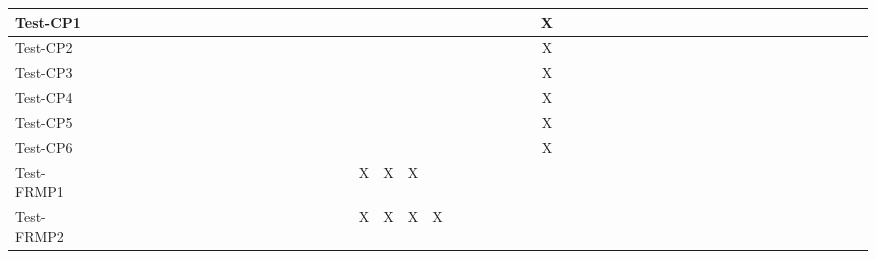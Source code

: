 \documentclass[12pt, titlepage]{article}
\begin{document}
\begin{landscape}
\begin{table}[H]
\begin{adjustwidth}{-0.1in}{-1in}
{\begin{tabular}{c|c|c|c|c|c|c|c|c|c|c|c|c|c|c|c|c|c|c|c|c|c|c|c|c|c|c|c|c|c|c|c|c|c|c|c|c|c|c|c|c|c|c|c|c|c|c|c|c|c|c|c|}
\multicolumn{1}{|l|}{{Test-CP1}}  &             &              &             &             &             &             &             &             &              &              &             &             &              &             &              &            &&&&&&&&&&&&&X&&&&&&&&&&&&&&&&&&&&&&  \\ \hline
\multicolumn{1}{|l|}{{Test-CP2}}  &             &              &             &              &             &             &             &             &              &              &             &             &              &             &              &            &&&&&&&&&&&&&X&&&&&&&&&&&&&&&&&&&&&& \\ \hline
\multicolumn{1}{|l|}{{Test-CP3}}  &             &              &             &              &             &             &             &             &              &              &             &             &              &             &              &            &&&&&&&&&&&&&X&&&&&&&&&&&&&&&&&&&&&&  \\ \hline
\multicolumn{1}{|l|}{{Test-CP4}}  &             &              &             &              &             &             &             &             &              &              &             &             &              &             &              &            &&&&&&&&&&&&&X&&&&&&&&&&&&&&&&&&&&&&  \\ \hline
\multicolumn{1}{|l|}{{Test-CP5}}  &             &              &             &              &             &             &             &             &              &              &             &             &              &             &              &            &&&&&&&&&&&&&X&&&&&&&&&&&&&&&&&&&&&& \\ \hline
\multicolumn{1}{|l|}{{Test-CP6}}  &             &              &             &              &             &             &             &             &              &              &             &             &              &             &              &            &&&&&&&&&&&&&X&&&&&&&&&&&&&&&&&&&&&& \\ \hline
\multicolumn{1}{|l|}{{Test-FRMP1}}  &             &              &             &              &             &             &             &             &              &              &             &             &              &             &              &             &&&X&X&X&&&&&&&&&&&&&&&&&&&&&&&&&&&&&&  \\ \hline
\multicolumn{1}{|l|}{{Test-FRMP2}}  &             &             &             &              &            &             &             &             &              &              &             &             &              &             &              &               &&&X&X&X&X&&&&&&&&&&&&&&&&&&&&&&&&&&&&&  \\ \hline

\end{tabular}}
\end{adjustwidth}
\end{table}
\end{landscape}
\end{document}
